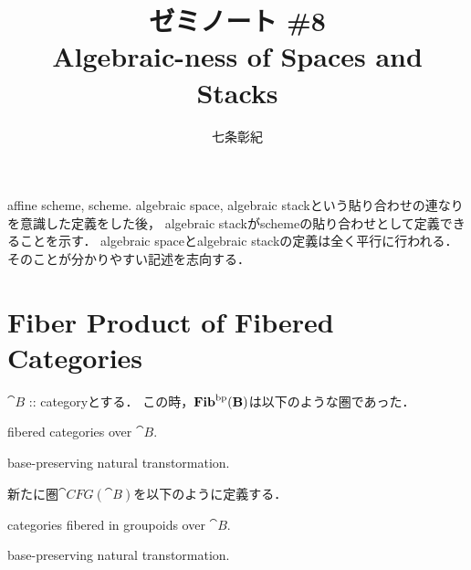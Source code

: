 \documentclass[a4paper, dvipdfmx]{jsarticle}
\newcommand{\CFG}[1]{\cat{CFG}(\cat{#1})}
\begin{document}
\title{ゼミノート \#8 \\ Algebraic-ness of Spaces and Stacks}
\author{七条彰紀}
\maketitle
affine scheme, scheme. algebraic space, algebraic stackという貼り合わせの連なりを意識した定義をした後，
algebraic stackがschemeの貼り合わせとして定義できることを示す．
algebraic spaceとalgebraic stackの定義は全く平行に行われる．
そのことが分かりやすい記述を志向する．

\section{Fiber Product of Fibered Categories}
    $\cat{B}$ :: categoryとする．
    この時，$\mathbf{Fib}^{\mathrm{bp}}(\mathbf{B})$は以下のような圏であった．
    \begin{description}[labelindent=1cm]
        \item[Objects:] fibered categories over $\cat{B}$.
        \item[Arrows:]  base-preserving natural transtormation.
    \end{description}
    新たに圏$\CFG{B}$を以下のように定義する．
    \begin{description}[labelindent=1cm]
        \item[Objects:] categories fibered in groupoids over $\cat{B}$.
        \item[Arrows:] base-preserving natural transtormation.
    \end{description}
\end{document}
